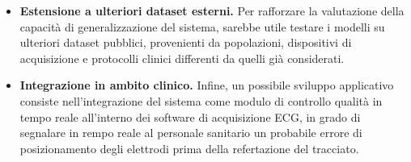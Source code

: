 \begin{itemize}
	\item \textbf{Estensione a ulteriori dataset esterni.} Per rafforzare la valutazione della capacità di generalizzazione del sistema, sarebbe utile testare i modelli su ulteriori dataset pubblici, provenienti da popolazioni, dispositivi di acquisizione e protocolli clinici differenti da quelli già considerati.
	
	\item \textbf{Integrazione in ambito clinico.} Infine, un possibile sviluppo applicativo consiste nell'integrazione del sistema come modulo di controllo qualità in tempo reale all'interno dei software di acquisizione ECG, in grado di segnalare in rempo reale al personale sanitario un probabile errore di posizionamento degli elettrodi prima della refertazione del tracciato.
\end{itemize}